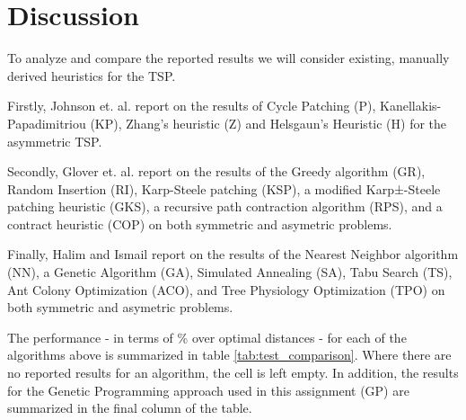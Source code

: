 \section{Discussion}

To analyze and compare the reported results we will consider existing, manually derived heuristics for the TSP. 

Firstly, Johnson et. al. \cite{johnson2007experimental} report on the results of Cycle Patching (P), Kanellakis-Papadimitriou (KP), Zhang's heuristic (Z) and Helsgaun's Heuristic (H) for the asymmetric TSP. 

Secondly, Glover et. al. \cite{glover2001construction} report on the results of the Greedy  algorithm (GR), Random Insertion (RI), Karp-Steele  patching (KSP), a modified Karp±-Steele patching heuristic (GKS), a recursive path contraction algorithm (RPS), and a contract heuristic (COP) on both symmetric and asymetric problems.

Finally, Halim and Ismail \cite{halim2019combinatorial} report on the results of the Nearest Neighbor  algorithm (NN), a Genetic Algorithm (GA), Simulated Annealing (SA), Tabu Search (TS), Ant Colony Optimization (ACO), and Tree Physiology Optimization (TPO) on both symmetric and asymetric problems.

The performance - in terms of \% over optimal distances - for each of the algorithms above is summarized in table \ref{tab:test_comparison}. Where there are no reported results for an algorithm, the cell is left empty. In addition, the results for the Genetic Programming approach used in this assignment (GP) are summarized in the final column of the table.

